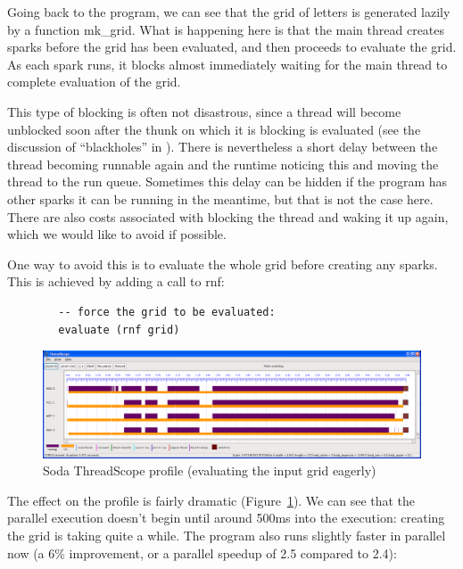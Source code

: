 \documentclass[twocolumn,9pt]{sigplanconf}
\newcommand{\codef}[1]{{\fontfamily{cmss}\small#1}}
\begin{document}
Going back to the program, we can see that the grid of letters is
generated lazily by a function \codef{mk\_grid}.  What is happening here is
that the main thread creates sparks before the grid has been
evaluated, and then proceeds to evaluate the grid.  As each spark
runs, it blocks almost immediately waiting for the main thread to
complete evaluation of the grid.

This type of blocking is often not disastrous, since a thread will become
unblocked soon after the thunk on which it is blocking is evaluated
(see the discussion of ``blackholes'' in \citet{multicore-ghc}).  There
is nevertheless a short delay between the thread becoming runnable
again and the runtime noticing this and moving the thread to the run
queue.  Sometimes this delay can be hidden if the program has other
sparks it can be running in the meantime, but that is not the case
here.  There are also costs associated with blocking the thread and waking
it up again, which we would like to avoid if possible.

One way to avoid this is to evaluate the whole grid before creating
any sparks.  This is achieved by adding a call to \codef{rnf}:

\begin{lstlisting}
        -- force the grid to be evaluated:
        evaluate (rnf grid)
\end{lstlisting}

\begin{figure}
\begin{center}
\includegraphics[scale=0.3]{soda3.png}
\end{center}
\caption{Soda ThreadScope profile (evaluating the input grid eagerly)}
\label{f:soda-threadscope3}
\end{figure}

The effect on the profile is fairly dramatic
(Figure~\ref{f:soda-threadscope3}).  We can see that the parallel
execution doesn't begin until around 500ms into the execution:
creating the grid is taking quite a while.  The program also runs
slightly faster in parallel now (a 6\% improvement, or a parallel
speedup of 2.5 compared to 2.4):
\end{document}
